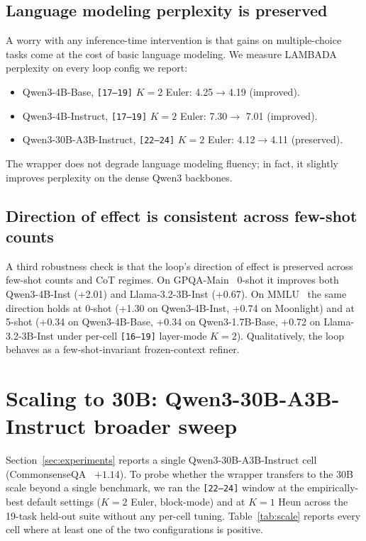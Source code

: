 \subsection{Language modeling perplexity is preserved}

A worry with any inference-time intervention is that gains on multiple-choice tasks come at the cost of basic language modeling. We measure LAMBADA~\citep{paperno2016lambada} perplexity on every loop config we report:

\begin{itemize}
\item Qwen3-4B-Base, \texttt{[17--19]} $K{=}2$ Euler:
      4.25$\to$4.19 (improved).
\item Qwen3-4B-Instruct, \texttt{[17--19]} $K{=}2$ Euler:
      7.30$\to$ 7.01 (improved).
\item Qwen3-30B-A3B-Instruct, \texttt{[22--24]} $K{=}2$ Euler:
      4.12$\to$4.11 (preserved).
\end{itemize}

The wrapper does not degrade language modeling fluency; in fact, it slightly improves perplexity on the dense Qwen3 backbones.

\subsection{Direction of effect is consistent across few-shot counts}

A third robustness check is that the loop's direction of effect is preserved across few-shot counts and CoT regimes. On GPQA-Main~\citep{rein2024gpqa} 0-shot it improves both Qwen3-4B-Inst (+2.01) and Llama-3.2-3B-Inst (+0.67). On MMLU~\citep{hendrycks2021mmlu} the same direction holds at 0-shot (+1.30 on Qwen3-4B-Inst, +0.74 on Moonlight) and at 5-shot (+0.34 on Qwen3-4B-Base, +0.34 on Qwen3-1.7B-Base, +0.72 on Llama-3.2-3B-Inst under per-cell \texttt{[16--19]} layer-mode $K{=}2$). Qualitatively, the loop behaves as a few-shot-invariant frozen-context refiner.

\section{Scaling to 30B: Qwen3-30B-A3B-Instruct broader sweep}
\label{app:scale30b}

Section~\ref{sec:experiments} reports a single Qwen3-30B-A3B-Instruct cell (CommonsenseQA~\citep{talmor2019csqa} $+1.14$). To probe whether the wrapper transfers to the 30B scale beyond a single benchmark, we ran the \texttt{[22--24]} window at the empirically-best default settings ($K{=}2$ Euler, block-mode) and at $K{=}1$ Heun across the 19-task held-out suite without any per-cell tuning. Table~\ref{tab:scale} reports every cell where at least one of the two configurations is positive.

